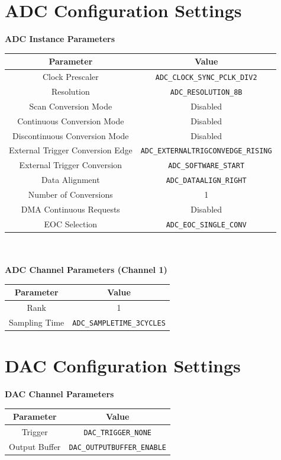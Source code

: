 \documentclass[12pt]{report}
\begin{document}
\begin{appendix}
	\chapter{ADC Configuration Settings}\label{appendixadc}
	\textbf{ADC Instance Parameters}\\
	\begin{tabular}{|c|c|}
		\hline
		Parameter & Value\\\hline
		Clock Prescaler & \texttt{ADC\_CLOCK\_SYNC\_PCLK\_DIV2}\\\hline
		Resolution & \texttt{ADC\_RESOLUTION\_8B}\\\hline
		Scan Conversion Mode & Disabled\\\hline
		Continuous Conversion Mode & Disabled\\\hline
		Discontinuous Conversion Mode & Disabled\\\hline
		External Trigger Conversion Edge & \texttt{ADC\_EXTERNALTRIGCONVEDGE\_RISING}\\\hline
		External Trigger Conversion & \texttt{ADC\_SOFTWARE\_START}\\\hline
		Data Alignment & \texttt{ADC\_DATAALIGN\_RIGHT}\\\hline
		Number of Conversions & 1\\\hline
		DMA Continuous Requests & Disabled\\\hline
		EOC Selection & \texttt{ADC\_EOC\_SINGLE\_CONV}\\\hline
	\end{tabular}
	\newline
	\\\\
	\textbf{ADC Channel Parameters (Channel 1)}\\
	\begin{tabular}{|c|c|}
		\hline
		Parameter & Value\\\hline
		Rank & 1\\\hline
		Sampling Time & \texttt{ADC\_SAMPLETIME\_3CYCLES}\\\hline
	\end{tabular}
	\newpage
	\chapter{DAC Configuration Settings}\label{appendixdac}
	\textbf{DAC Channel Parameters}\\
	\begin{tabular}{|c|c|}
		\hline
		Parameter & Value\\\hline
		Trigger & \texttt{DAC\_TRIGGER\_NONE}\\\hline
		Output Buffer & \texttt{DAC\_OUTPUTBUFFER\_ENABLE}\\\hline
	\end{tabular}
	

\end{appendix}
\end{document}
